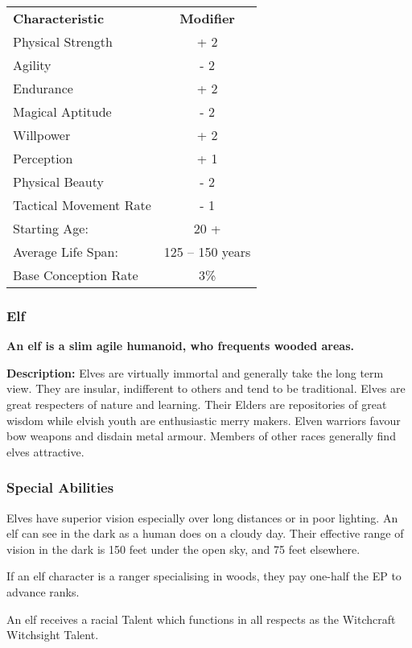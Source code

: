 \begin{multicols*}{3}
\begin{tabularx}{\linewidth}{Xc}
\textbf{Characteristic} & \textbf{Modifier} \\
Physical Strength	& + 2 \\
Agility			& - 2 \\
Endurance		& + 2 \\
Magical Aptitude	& - 2 \\
Willpower		& + 2 \\
Perception		& + 1 \\
Physical Beauty		& - 2 \\
Tactical Movement Rate	& - 1 \\
Starting Age:		& 20 + \\
Average Life Span:	& 125 -- 150 years \\
Base Conception Rate	& 3\% \\
\end{tabularx}

\subsubsection{Elf}

\textbf{An elf is a slim agile humanoid, who frequents wooded areas.}

\textbf{Description:} Elves are virtually immortal and generally take
the long term view. They are insular, indifferent to others and tend
to be traditional.  Elves are great respecters of nature and
learning. Their Elders are repositories of great wisdom while elvish
youth are enthusiastic merry makers. Elven warriors favour bow weapons
and disdain metal armour. Members of other races generally find elves
attractive.

\subsubsection{Special Abilities}

\begin{Enumerate}
\item
Elves have superior vision especially over long distances or in poor
lighting.  An elf can see in the dark as a human does on a cloudy
day. Their effective range of vision in the dark is 150 feet under the
open sky, and 75 feet elsewhere.

\item
If an elf character is a ranger specialising in woods, they pay
one-half the EP to advance ranks.

\item
An elf receives a racial Talent which functions in all respects as the
Witchcraft Witchsight Talent.


\end{Enumerate}
\end{multicols*}
